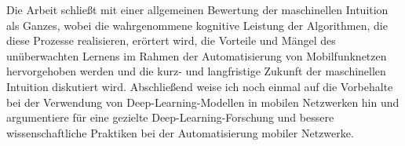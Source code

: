 Die Arbeit schließt mit einer allgemeinen Bewertung der maschinellen Intuition als Ganzes, wobei die wahrgenommene kognitive Leistung der Algorithmen, die diese Prozesse realisieren, erörtert wird, die Vorteile und Mängel des unüberwachten Lernens im Rahmen der Automatisierung von Mobilfunknetzen hervorgehoben werden und die kurz- und langfristige Zukunft der maschinellen Intuition diskutiert wird.
Abschließend weise ich noch einmal auf die Vorbehalte bei der Verwendung von Deep-Learning-Modellen in mobilen Netzwerken hin und argumentiere für eine gezielte Deep-Learning-Forschung und bessere wissenschaftliche Praktiken bei der Automatisierung mobiler Netzwerke.

\clearpage





